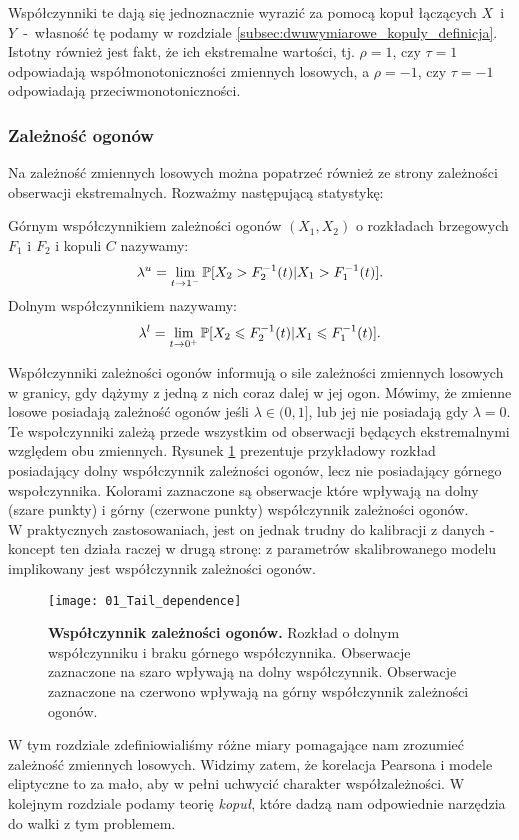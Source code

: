 Współczynniki te dają się jednoznacznie wyrazić za pomocą kopuł łączących $X$~i~$Y$~-~własność tę podamy w rozdziale \ref{subsec:dwuwymiarowe_kopuly_definicja}. Istotny również jest fakt, że ich ekstremalne wartości, tj. $\rho= 1$, czy $\tau=1$ odpowiadają współmonotoniczności zmiennych losowych, a $\rho=-1$, czy $\tau=-1$ odpowiadają przeciwmonotoniczności.

\subsubsection{Zależność ogonów}
Na zależność zmiennych losowych można popatrzeć również ze strony zależności obserwacji ekstremalnych. Rozważmy następującą statystykę:

\begin{df}
	Górnym współczynnikiem zależności ogonów $(X_1, X_2)$ o rozkładach brzegowych $F_1$ i $F_2$ i kopuli $C$ nazywamy:
	$$ \lambda^{u} = \lim\limits_{t\to1^{-}}\mathbb{P}[X_2 > F_2^{-1}(t) \vert X_1 > F_1^{-1}(t) ].$$
	Dolnym współczynnikiem nazywamy:
	$$ \lambda^{l} = \lim\limits_{t\to0^{+}}\mathbb{P}[X_2 \leqslant F_2^{-1}(t) \vert X_1 \leqslant F_1^{-1}(t) ].$$
\end{df}

Współczynniki zależności ogonów informują o sile zależności zmiennych losowych w granicy, gdy dążymy z jedną z nich coraz dalej w jej ogon. Mówimy, że zmienne losowe posiadają zależność ogonów jeśli $\lambda \in (0, 1]$, lub jej nie posiadają gdy $\lambda =0$. Te wspołczynniki zależą przede wszystkim od obserwacji będących ekstremalnymi względem obu zmiennych. Rysunek \ref{fig:tail_dependence} prezentuje przykładowy rozkład posiadający dolny współczynnik zależności ogonów, lecz nie posiadający górnego wspołczynnika. Kolorami zaznaczone są obserwacje które wpływają na dolny (szare punkty) i górny (czerwone punkty) współczynnik zależności ogonów.\\
W praktycznych zastosowaniach, jest on jednak trudny do kalibracji z danych - koncept ten działa raczej w drugą stronę: z parametrów skalibrowanego modelu implikowany jest współczynnik zależności ogonów.
\begin{figure}[H]
	\centering
	\texttt{[image: 01\_Tail\_dependence]}	
	\caption{\textbf{Współczynnik zależności ogonów.} Rozkład o dolnym współczynniku i braku górnego współczynnika. Obserwacje zaznaczone na szaro wpływają na dolny współczynnik. Obserwacje zaznaczone na czerwono wpływają na górny współczynnik zależności ogonów.\label{fig:tail_dependence}}
\end{figure}

W tym rozdziale zdefiniowialiśmy różne miary pomagające nam zrozumieć zależność zmiennych losowych. Widzimy zatem, że korelacja Pearsona i modele eliptyczne to za mało, aby w pełni uchwycić charakter współzależności. W kolejnym rozdziale podamy teorię \emph{kopuł}, które dadzą nam odpowiednie narzędzia do walki z tym problemem.